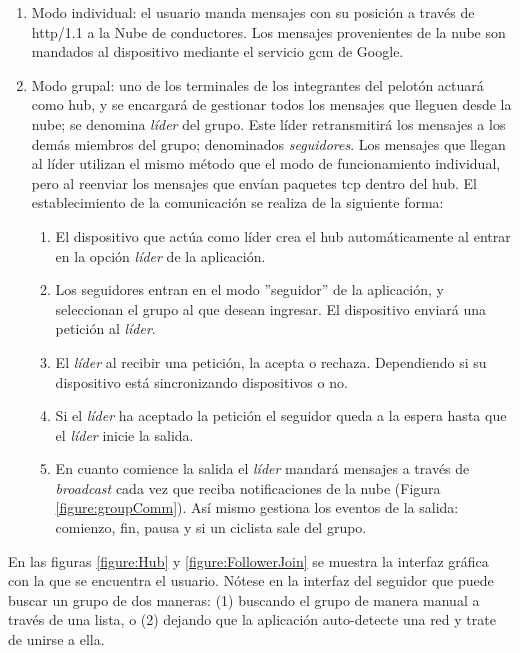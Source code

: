 \begin{enumerate}
	\item Modo individual: el usuario manda mensajes con su posición a través
	de \Gls{http/1.1} a la Nube de conductores. Los mensajes provenientes de la
	nube son mandados al dispositivo mediante el servicio \gls{gcm} de Google.

	\item Modo grupal: uno de los terminales de los integrantes del pelotón
	actuará	como hub, y se encargará de	gestionar todos los mensajes que
	lleguen desde la nube; se denomina \emph{líder} del grupo. Este líder
	retransmitirá los mensajes a los demás miembros del grupo; denominados
	\emph{seguidores}. Los mensajes que llegan al líder utilizan el mismo método
	que el modo de funcionamiento individual, pero al reenviar los mensajes que
	envían paquetes \gls{tcp} dentro del hub. El establecimiento de la
	comunicación se realiza de la siguiente forma:

	\begin{enumerate}
		\item El dispositivo que actúa como líder crea el hub automáticamente al
		entrar en la opción \emph{líder} de la aplicación.

		\item Los seguidores entran en el modo ''seguidor'' de la aplicación, y
		seleccionan el grupo al que desean ingresar. El dispositivo enviará una
		petición al \emph{líder}.

		\item El \emph{líder} al recibir una petición, la acepta o rechaza.
		Dependiendo	si su dispositivo está sincronizando dispositivos o no.

		\item Si el \emph{líder} ha aceptado la petición el seguidor queda a la
		espera hasta que el \emph{líder} inicie la salida.

		\item En cuanto comience la salida el \emph{líder} mandará mensajes a
		través de \emph{broadcast} cada vez que reciba notificaciones de la nube
		(Figura \ref{figure:groupComm}). Así mismo	gestiona los eventos de la
		salida: comienzo, fin, pausa y si un ciclista sale del grupo.
	\end{enumerate}
\end{enumerate}

En las figuras \ref{figure:Hub} y \ref{figure:FollowerJoin} se muestra la
interfaz gráfica con la que se encuentra el usuario. Nótese en la interfaz
del seguidor que puede buscar un grupo de dos maneras: (1) buscando el grupo
de manera manual a través de una lista, o (2) dejando que la aplicación
auto-detecte una red y trate de unirse a ella.

